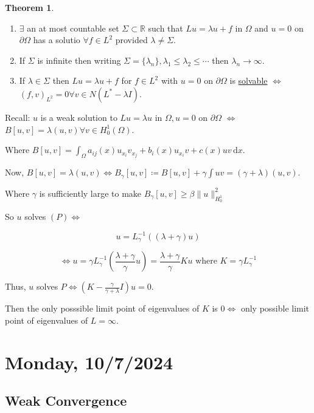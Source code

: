 \documentclass{article}
\theoremstyle{definition}
\newtheorem{theorem}{Theorem}
\begin{document}
\begin{theorem}
    \begin{enumerate}[label=\roman*)]
        \item \(\exists \) an at most countable set \(\Sigma \subset \mathbb{R} \) such that \(Lu = \lambda  u + f\) in \(\Omega\) and \(u = 0\) on \(\partial \Omega\) has a solutio \(\forall f\in L^2\) provided \(\lambda \neq \Sigma\).
        \item If \(\Sigma\) is infinite then writing \(\Sigma = \{ \lambda_n \}, \lambda_1 \leq \lambda_2 \leq \cdots \) then \(\lambda_n \to \infty \).
        \item If \(\lambda \in \Sigma\) then \(L u = \lambda u + f\) for \(f\in L^2\) with \(u=0\) on \(\partial \Omega\) is \underline{solvable} \(\iff\) \((f,v)_{L^2} = 0 \forall v\in N(L^{\ast} -\lambda I)\).  
    \end{enumerate} 
\end{theorem}

Recall: \(u\) is a weak solution to \(Lu = \lambda u\) in \(\Omega, u=0\) on \(\partial \Omega\) \(\iff\) \(B[u,v] = \lambda (u,v) \forall v\in H^1_0(\Omega)\).

Where \(B[u,v] = \int_\Omega a_{ij}(x) u_{x_i}v_{x_j} + b_i(x) u_{x_i}v + c(x)uv \, \mathrm{d}x\).

Now, \(B[u,v]=\lambda (u,v) \iff B_\gamma [u,v] \coloneqq B[u,v]+ \gamma \int uv = (\gamma + \lambda) (u,v)\). 

Where \(\gamma\) is sufficiently large to make \(B_\gamma [u,v] \geq \beta \lVert u \rVert ^2 _{H^1_0}\) 

So \(u\) solves \((P) \iff\)

\[
    u = L_\gamma ^{-1} \left( (\lambda + \gamma)u \right) 
\]

\[
    \iff u = \gamma L_\gamma ^{-1} \left( \frac{\lambda+\gamma}{\gamma} u \right) = \frac{\lambda + \gamma}{\gamma} K u \text{ where } K = \gamma L_\gamma ^{-1}
\]

Thus, \(u\) solves \(P \iff \left( K - \frac{\gamma}{\gamma + \lambda} I \right) u = 0\). 

Then the only posssible limit point of eigenvalues of \(K\) is \(0 \iff \) only possible limit point of eigenvalues of \(L = \infty\).

\section*{Monday, 10/7/2024}

\subsection*{Weak Convergence}
\end{document}
